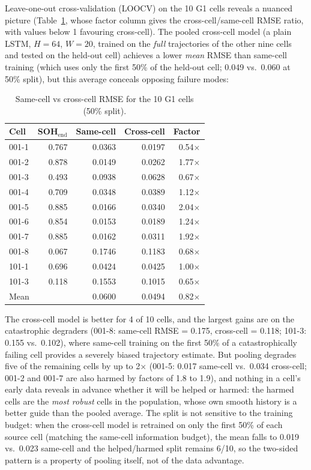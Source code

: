 Leave-one-out cross-validation (LOOCV) on the 10 G1 cells reveals a nuanced
picture (Table~\ref{tab:loocv}, whose factor column gives the
cross-cell/same-cell RMSE ratio, with values below 1 favouring cross-cell).
The pooled cross-cell model (a plain LSTM, $H=64$, $W=20$, trained on the
\emph{full} trajectories of
the other nine cells and tested on the held-out cell) achieves a lower
\textit{mean} RMSE than same-cell training (which uses only the first 50\% of the
held-out cell; 0.049 vs.\ 0.060 at 50\% split), but this average conceals
opposing failure modes:

\begin{table}[pos=htbp]
\caption{Same-cell vs cross-cell RMSE for the 10 G1 cells (50\% split).}
\label{tab:loocv}
\begin{tabular*}{\columnwidth}{@{\extracolsep{\fill}}lrrrr}
\toprule
Cell & SOH$_\text{end}$ & Same-cell & Cross-cell & Factor \\
\midrule
001-1 & 0.767 & 0.0363 & 0.0197 & 0.54$\times$ \\
001-2 & 0.878 & 0.0149 & 0.0262 & 1.77$\times$ \\
001-3 & 0.493 & 0.0938 & 0.0628 & 0.67$\times$ \\
001-4 & 0.709 & 0.0348 & 0.0389 & 1.12$\times$ \\
001-5 & 0.885 & 0.0166 & 0.0340 & 2.04$\times$ \\
001-6 & 0.854 & 0.0153 & 0.0189 & 1.24$\times$ \\
001-7 & 0.885 & 0.0162 & 0.0311 & 1.92$\times$ \\
001-8 & 0.067 & 0.1746 & 0.1183 & 0.68$\times$ \\
101-1 & 0.696 & 0.0424 & 0.0425 & 1.00$\times$ \\
101-3 & 0.118 & 0.1553 & 0.1015 & 0.65$\times$ \\
\midrule
Mean  &       & 0.0600 & 0.0494 & 0.82$\times$ \\
\bottomrule
\end{tabular*}
\end{table}

The cross-cell model is better for 4 of 10 cells, and the largest gains are
on the catastrophic degraders (001-8: same-cell RMSE = 0.175, cross-cell =
0.118; 101-3: 0.155 vs.\ 0.102), where same-cell training on the first 50\%
of a catastrophically failing cell provides a severely biased trajectory
estimate.
But pooling degrades five of the remaining cells by up to 2$\times$ (001-5:
0.017 same-cell vs.\ 0.034 cross-cell; 001-2 and 001-7 are also harmed by
factors of 1.8 to 1.9), and nothing in a cell's early data reveals in advance
whether it will be helped or harmed: the harmed cells are the \emph{most
robust} cells in the population, whose own smooth history is a better guide
than the pooled average.
The split is not sensitive to the training budget: when the cross-cell model
is retrained on only the first 50\% of each source cell (matching the
same-cell information budget), the mean falls to 0.019 vs.\ 0.023 same-cell
and the helped/harmed split remains 6/10, so the two-sided pattern is a
property of pooling itself, not of the data advantage.


